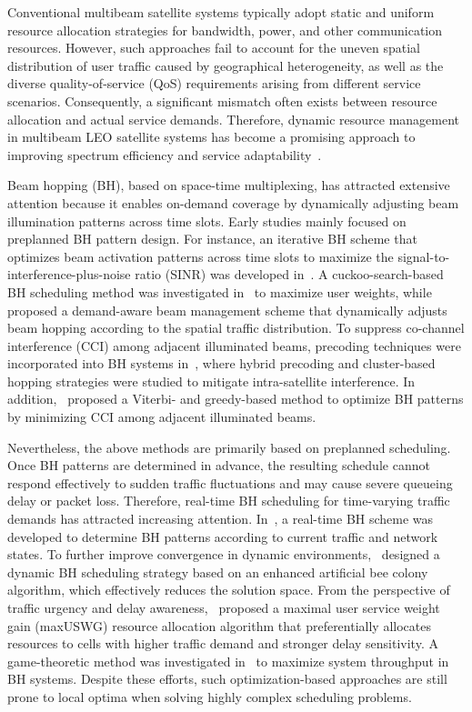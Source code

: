 \documentclass[journal]{IEEEtran}
\begin{document}
Conventional multibeam satellite systems typically adopt static and uniform resource allocation strategies for bandwidth, power, and other communication resources. However, such approaches fail to account for the uneven spatial distribution of user traffic caused by geographical heterogeneity, as well as the diverse quality-of-service (QoS) requirements arising from different service scenarios. Consequently, a significant mismatch often exists between resource allocation and actual service demands. Therefore, dynamic resource management in multibeam LEO satellite systems has become a promising approach to improving spectrum efficiency and service adaptability~\cite{ref5}.

Beam hopping (BH), based on space-time multiplexing, has attracted extensive attention because it enables on-demand coverage by dynamically adjusting beam illumination patterns across time slots. Early studies mainly focused on preplanned BH pattern design. For instance, an iterative BH scheme that optimizes beam activation patterns across time slots to maximize the signal-to-interference-plus-noise ratio (SINR) was developed in~\cite{ref6}. A cuckoo-search-based BH scheduling method was investigated in~\cite{ref7} to maximize user weights, while~\cite{ref8} proposed a demand-aware beam management scheme that dynamically adjusts beam hopping according to the spatial traffic distribution. To suppress co-channel interference (CCI) among adjacent illuminated beams, precoding techniques were incorporated into BH systems in~\cite{ref9,ref10}, where hybrid precoding and cluster-based hopping strategies were studied to mitigate intra-satellite interference. In addition,~\cite{ref11} proposed a Viterbi- and greedy-based method to optimize BH patterns by minimizing CCI among adjacent illuminated beams.


Nevertheless, the above methods are primarily based on preplanned scheduling. Once BH patterns are determined in advance, the resulting schedule cannot respond effectively to sudden traffic fluctuations and may cause severe queueing delay or packet loss. Therefore, real-time BH scheduling for time-varying traffic demands has attracted increasing attention. In~\cite{ref12}, a real-time BH scheme was developed to determine BH patterns according to current traffic and network states. To further improve convergence in dynamic environments,~\cite{ref13} designed a dynamic BH scheduling strategy based on an enhanced artificial bee colony algorithm, which effectively reduces the solution space. From the perspective of traffic urgency and delay awareness,~\cite{ref14} proposed a maximal user service weight gain (maxUSWG) resource allocation algorithm that preferentially allocates resources to cells with higher traffic demand and stronger delay sensitivity. A game-theoretic method was investigated in~\cite{ref15} to maximize system throughput in BH systems. Despite these efforts, such optimization-based approaches are still prone to local optima when solving highly complex scheduling problems.
\end{document}
